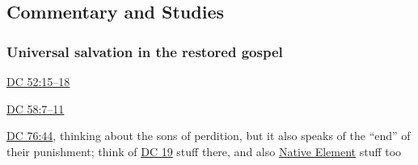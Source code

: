 	
	
	
	
\subsection{Commentary and Studies} %
	\label{SALVATION-COMMENTARY}

	
		
	\subsubsection{Universal salvation in the restored gospel}
		\label{SALVATION-universal}
		
		\begin{compactitem}
			\item \hyperref[DC52-15]{DC 52:15--18}
			\item \hyperref[DC58-7]{DC 58:7--11}
			\item \hyperref[DC76-44]{DC 76:44}, thinking about the sons of perdition, but it also speaks of the ``end'' of their punishment; think of \hyperref[DC19]{DC 19} stuff there, and also \hyperref[NATIVEELEMENT]{Native Element} stuff too
		\end{compactitem}